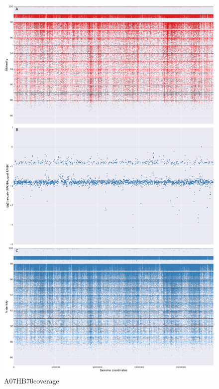 \begin{figure}[!hbtp]
  \centering
  \includegraphics[width=\textwidth,height=\textheight,keepaspectratio]{Chapter5/Figures/coverage_plots/A07HB70_coverage.pdf}
  \caption{A07HB70coverage}
  \label{A07HB70coverage}
\end{figure}

